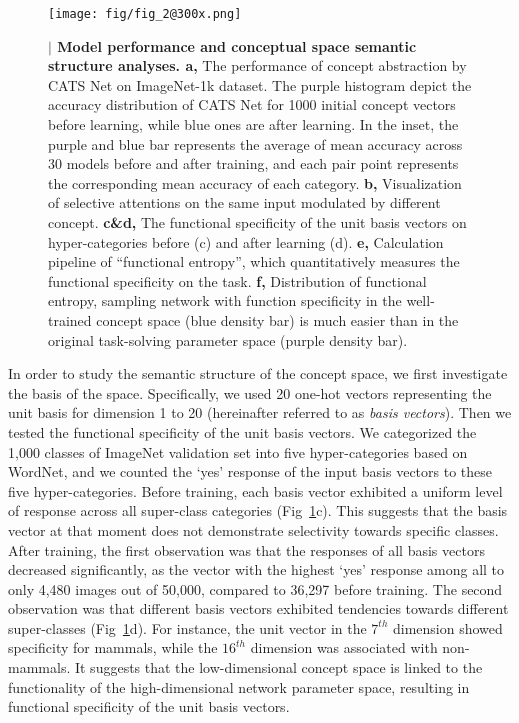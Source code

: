 \documentclass[pdflatex,sn-mathphys-num,lineno]{sn-jnl}%
\begin{document}
\begin{CJK}{UTF8}{gbsn}
\begin{figure}[htbp]
\centering
\texttt{[image: fig/fig\_2@300x.png]}
\caption{\textbf{$\vert$ Model performance and conceptual space semantic structure analyses. a,} The performance of concept abstraction by CATS Net on ImageNet-1k dataset. The purple histogram depict the accuracy distribution of CATS Net for 1000 initial concept vectors before learning, while blue ones are after learning.  In the inset,  the purple and blue bar represents the average of mean accuracy across 30 models before and after training, and each pair point represents the corresponding mean accuracy of each category. \textbf{b,} Visualization of selective attentions on the same input modulated by different concept. \textbf{c\&d,} The functional specificity of the unit basis vectors on hyper-categories before (c) and after learning (d). \textbf{e,} Calculation pipeline of “functional entropy”, which quantitatively measures the functional specificity on the task. \textbf{f,} Distribution of functional entropy, sampling network with function specificity in the well-trained concept space (blue density bar) is much easier than in the original task-solving parameter space (purple density bar).}
\label{fig2}
\end{figure}

In order to study the semantic structure of the concept space, we first investigate the basis of the space. Specifically, we used 20 one-hot vectors representing the unit basis for dimension 1 to 20 (hereinafter referred to as \textit{basis vectors}). Then we tested the functional specificity of the unit basis vectors. We categorized the 1,000 classes of ImageNet validation set into five hyper-categories based on WordNet, and we counted the ‘yes’ response of the input basis vectors to these five hyper-categories. Before training, each basis vector exhibited a uniform level of response across all super-class categories (Fig~\ref{fig2}c). This suggests that the basis vector at that moment does not demonstrate selectivity towards specific classes. After training, the first observation was that the responses of all basis vectors decreased significantly, as the vector with the highest ‘yes’ response among all to only 4,480 images out of 50,000, compared to 36,297 before training. The second observation was that different basis vectors exhibited tendencies towards different super-classes (Fig~\ref{fig2}d). For instance, the unit vector in the $7^{th}$ dimension showed specificity for mammals, while the $16^{th}$ dimension was associated with non-mammals. It suggests that the low-dimensional concept space is linked to the functionality of the high-dimensional network parameter space, resulting in functional specificity of the unit basis vectors. 


\end{CJK}
\end{document}
